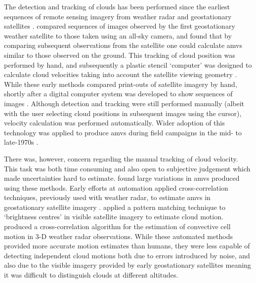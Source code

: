 The detection and tracking of clouds has been performed since the earliest sequences of remote sensing imagery from weather radar and geostationary satellites \citep{menzel_cloud_2001}.
\citet{fujita_study_1968} compared sequences of images observed by the first geostationary weather satellite to those taken using an all-sky camera, and found that by comparing subsequent observations from the satellite one could calculate \acrshort{amv}s similar to those observed on the ground.
This tracking of cloud position was performed by hand, and subsequently a plastic stencil `computer' was designed to calculate cloud velocities taking into account the satellite viewing geometry \citep{fujita_present_1969}.
While these early methods compared print-outs of satellite imagery by hand, shortly after a digital computer system was developed to show sequences of images \citep{chang_metracom_1973}.
Although detection and tracking were still performed manually (albeit with the user selecting cloud positions in subsequent images using the cursor), velocity calculation was performed automatically.
Wider adoption of this technology was applied to produce \acrshort{amv}s during field campaigns in the mid- to late-1970s \citep{tecson_cloud-motion_1975}.

There was, however, concern regarding the manual tracking of cloud velocity.
This task was both time consuming and also open to subjective judgement which made uncertainties hard to estimate.
\citet{fujita_satellite-tracked_1975} found large variations in \acrshort{amv}s produced using these methods.
Early efforts at automation applied cross-correlation techniques, previously used with weather radar, to estimate \acrshort{amv}s in geostationary satellite imagery \citep{leese_determination_1970}.
\citet{endlich_use_1971} applied a pattern matching technique to `brightness centres' in visible satellite imagery to estimate cloud motion.
\citet{rinehart_three-dimensional_1978} produced a cross-correlation algorithm for the estimation of convective cell motion in 3-D weather radar observations.
While these automated methods provided more accurate motion estimates than humans, they were less capable of detecting independent cloud motions both due to errors introduced by noise, and also due to the visible imagery provided by early geostationary satellites meaning it was difficult to distinguish clouds at different altitudes.

